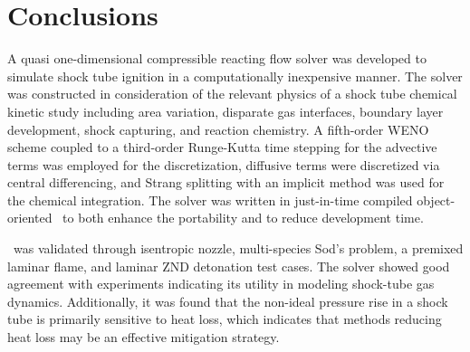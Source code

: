 \begin{table}[!t!]
	\centering
	\footnotesize
	\caption{\label{TABLE_OPT} Summary table of the configurations for the \stnshk\ driver insert runs. Experimental and simulated pressure rises computed according to Eq.~\ref{EQ_PR}. The shock tube geometry matches that reported by Hong~\emph{et al.}~\cite{HONG_PANG_VASU_DAVIDSON_HANSON_SW2009} for the high pressure shock tube.}
\end{table}
\section{Conclusions}
A quasi one-dimensional compressible reacting flow solver was developed to simulate shock tube ignition in a computationally inexpensive manner. The solver was constructed in consideration of the relevant physics of a shock tube chemical kinetic study including area variation, disparate gas interfaces, boundary layer development, shock capturing, and reaction chemistry. A fifth-order WENO scheme coupled to a third-order Runge-Kutta time stepping for the advective terms was employed for the discretization, diffusive terms were discretized via central differencing, and Strang splitting with an implicit method was used for the chemical integration. The solver was written in just-in-time compiled object-oriented \python\ to both enhance the portability and to reduce development time. 

\stnshk\ was validated through isentropic nozzle, multi-species Sod's problem, a premixed laminar flame, and laminar ZND detonation test cases. The solver showed good agreement with experiments indicating its utility in modeling shock-tube gas dynamics. Additionally, it was found that the non-ideal pressure rise in a shock tube is primarily sensitive to heat loss, which indicates that methods reducing heat loss may be an effective mitigation strategy.

